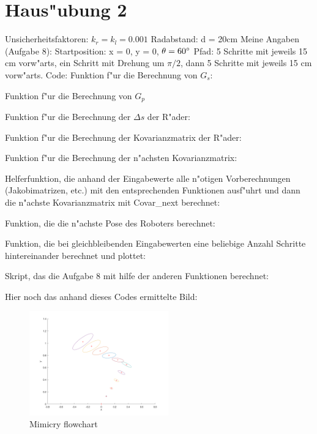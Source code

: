 \documentclass[11pt]{article}
\begin{document}


    \lstset{style=mystyle}

\section{Haus"ubung 2}\label{sec:h2}
    Unsicherheitsfaktoren: $k_{r} = k_{l} = 0.001$\newline
    Radabstand: d = 20cm\newline
    Meine Angaben (Aufgabe 8):\newline
    Startposition: x = 0, y = 0, $\theta = 60\degree$\newline
    Pfad: 5 Schritte mit jeweils 15 cm vorw"arts, ein Schritt mit Drehung um $\pi/2$, dann 5 Schritte mit jeweils 15 cm vorw"arts.\newline
    Code:\newline
Funktion f"ur die Berechnung von $G_{s}$:

Funktion f"ur die Berechnung von $G_{p}$

Funktion f"ur die Berechnung der $\Delta s$ der R"ader:

Funktion f"ur die Berechnung der Kovarianzmatrix der R"ader:

Funktion f"ur die Berechnung der n"achsten Kovarianzmatrix:

Helferfunktion, die anhand der Eingabewerte alle n"otigen Vorberechnungen (Jakobimatrizen, etc.) mit den entsprechenden Funktionen ausf"uhrt und dann die n"achste Kovarianzmatrix mit Covar\_next berechnet:

Funktion, die die n"achste Pose des Roboters berechnet:

Funktion, die bei gleichbleibenden Eingabewerten eine beliebige Anzahl Schritte hintereinander berechnet und plottet:

Skript, das die Aufgabe 8 mit hilfe der anderen Funktionen berechnet:

    Hier noch das anhand dieses Codes ermittelte Bild:
    \begin{figure}[H]
        \centering
        \includegraphics[width=6cm]{task8.png}
        \caption{Mimicry flowchart}
        \label{fig:result}
    \end{figure}
\end{document}
